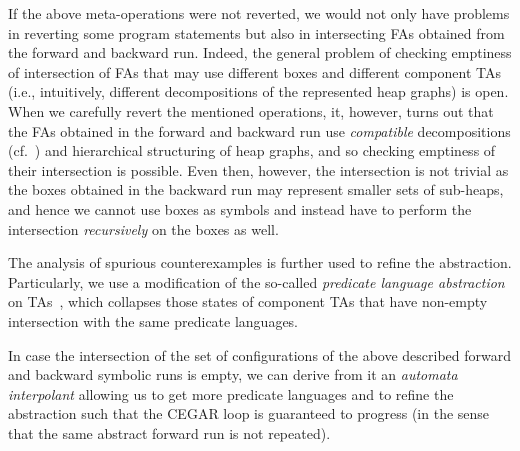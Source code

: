 If the above meta-operations were not reverted, we would not only have problems
in reverting some program statements but also in intersecting FAs obtained from
the forward and backward run. Indeed, the general problem of checking emptiness
of intersection of FAs that may use different boxes and different component TAs
(i.e., intuitively, different decompositions of the represented heap graphs) is
open. When we carefully revert the mentioned operations, it, however, turns out
that the FAs obtained in the forward and backward run use \emph{compatible}
decompositions (cf.~) and hierarchical structuring of heap graphs, and so checking
emptiness of their intersection is possible. Even then, however, the
intersection is not trivial as the boxes obtained in the backward run may
represent smaller sets of sub-heaps, and hence we cannot use boxes as symbols
and instead have to perform the intersection \emph{recursively} on the boxes as
well.

The analysis of spurious counterexamples is further used to refine the abstraction. 
%
Particularly, we use a modification of the so-called \emph{predicate
language abstraction} on TAs~\cite{artmc}, which 
collapses those states of component TAs that
have non-empty intersection with the same predicate languages.

%
In case the intersection of the set of configurations of the above described forward and backward symbolic runs
is empty, we can derive from it an \emph{automata interpolant} allowing us to
get more predicate languages and to refine the abstraction such that
the CEGAR loop is guaranteed to progress (in the sense that the same
abstract forward run is not repeated).

% 
%
%


